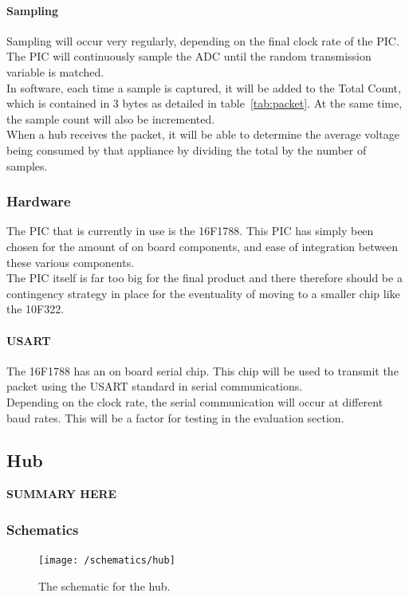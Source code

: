 \documentclass[draft,preprint,12pt,3p]{elsarticle}
\begin{document}
\paragraph{Sampling}
Sampling will occur very regularly, depending on the final clock rate of the PIC.\\
The PIC will continuously sample the ADC until the random transmission variable is matched.\\
In software, each time a sample is captured, it will be added to the Total Count, which is contained in 3 bytes as detailed in table~\ref{tab:packet}. At the same time, the sample count will also be incremented. \\
When a hub receives the packet, it will be able to determine the average voltage being consumed by that appliance by dividing the total by the number of samples.

\subsubsection{Hardware}
The PIC that is currently in use is the 16F1788. This PIC has simply been chosen for the amount of on board components, and ease of integration between these various components.\\
The PIC itself is far too big for the final product and there therefore should be a contingency strategy in place for the eventuality of moving to a smaller chip like the 10F322.

\paragraph{USART}
The 16F1788 has an on board serial chip. This chip will be used to transmit the packet using the USART standard in serial communications.\\
Depending on the clock rate, the serial communication will occur at different baud rates. This will be a factor for testing in the evaluation section.

\subsection{Hub}
\textbf{SUMMARY HERE}
\subsubsection{Schematics}
\begin{figure}[H]
    \centering
    \texttt{[image: /schematics/hub]}
    \caption{The schematic for the hub.}
\end{figure}
\end{document}
